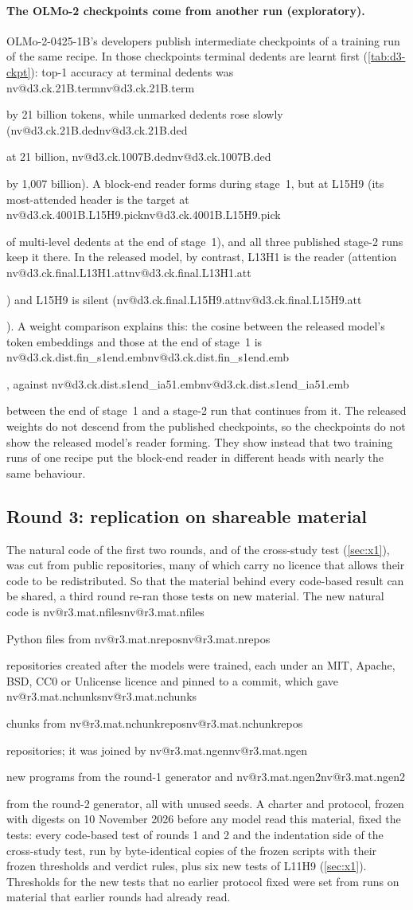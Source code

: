 \documentclass[11pt]{article}
\makeatletter
\newcommand{\nv}[1]{\ifcsname nv@#1\endcsname\csname nv@#1\endcsname\else\PackageError{numbers}{Unknown number key #1}{}\fi}
\newcommand{\hd}[2]{L#1H#2}
\newcommand{\olmo}{OLMo-2-0425-1B}
\makeatother
\begin{document}
\paragraph{The OLMo-2 checkpoints come from another run (exploratory).} \olmo{}'s developers publish intermediate checkpoints of a training run of the same recipe. In those checkpoints terminal dedents are learnt first (\cref{tab:d3-ckpt}): top-1 accuracy at terminal dedents was \nv{d3.ck.21B.term} by 21 billion tokens, while unmarked dedents rose slowly (\nv{d3.ck.21B.ded} at 21 billion, \nv{d3.ck.1007B.ded} by 1{,}007 billion). A block-end reader forms during stage~1, but at \hd{15}{9} (its most-attended header is the target at \nv{d3.ck.4001B.L15H9.pick} of multi-level dedents at the end of stage~1), and all three published stage-2 runs keep it there. In the released model, by contrast, \hd{13}{1} is the reader (attention \nv{d3.ck.final.L13H1.att}) and \hd{15}{9} is silent (\nv{d3.ck.final.L15H9.att}). A weight comparison explains this: the cosine between the released model's token embeddings and those at the end of stage~1 is \nv{d3.ck.dist.fin_s1end.emb}, against \nv{d3.ck.dist.s1end_ia51.emb} between the end of stage~1 and a stage-2 run that continues from it. The released weights do not descend from the published checkpoints, so the checkpoints do not show the released model's reader forming. They show instead that two training runs of one recipe put the block-end reader in different heads with nearly the same behaviour.

\subsection{Round 3: replication on shareable material}
\label{sec:r3}

The natural code of the first two rounds, and of the cross-study test (\cref{sec:x1}), was cut from public repositories, many of which carry no licence that allows their code to be redistributed. So that the material behind every code-based result can be shared, a third round re-ran those tests on new material. The new natural code is \nv{r3.mat.nfiles} Python files from \nv{r3.mat.nrepos} repositories created after the models were trained, each under an MIT, Apache, BSD, CC0 or Unlicense licence and pinned to a commit, which gave \nv{r3.mat.nchunks} chunks from \nv{r3.mat.nchunkrepos} repositories; it was joined by \nv{r3.mat.ngen} new programs from the round-1 generator and \nv{r3.mat.ngen2} from the round-2 generator, all with unused seeds. A charter and protocol, frozen with digests on 10 November 2026 before any model read this material, fixed the tests: every code-based test of rounds 1 and 2 and the indentation side of the cross-study test, run by byte-identical copies of the frozen scripts with their frozen thresholds and verdict rules, plus six new tests of \hd{11}{9} (\cref{sec:x1}). Thresholds for the new tests that no earlier protocol fixed were set from runs on material that earlier rounds had already read.
\end{document}

